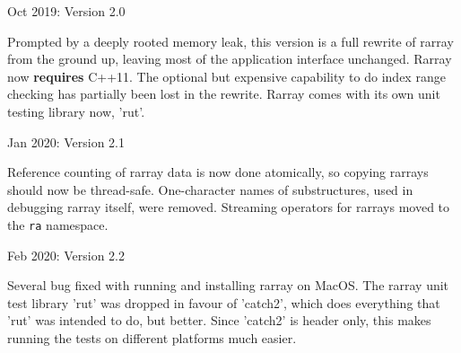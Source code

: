 \documentclass[11pt,twoside]{article}
\begin{document}
\noindent
Oct 2019: Version 2.0

Prompted by a deeply rooted memory leak, this version is a full
rewrite of rarray from the ground up, leaving most of the application
interface unchanged.  Rarray now \textbf{requires} C++11.
The optional but expensive capability to do index range checking has
partially been lost in the rewrite.  Rarray comes with its own unit testing
library now, 'rut'.

\noindent
Jan 2020: Version 2.1

Reference counting of rarray data is now done atomically, so copying
rarrays should now be thread-safe.  One-character names of
substructures, used in debugging rarray itself, were
removed. Streaming operators for rarrays moved to the \texttt{ra}
namespace.

\noindent
Feb 2020: Version 2.2

Several bug fixed with running and installing rarray on MacOS.  The
rarray unit test library 'rut' was dropped in favour of 'catch2',
which does everything that 'rut' was intended to do, but better. Since
'catch2' is header only, this makes running the tests on different
platforms much easier.
\end{document}
